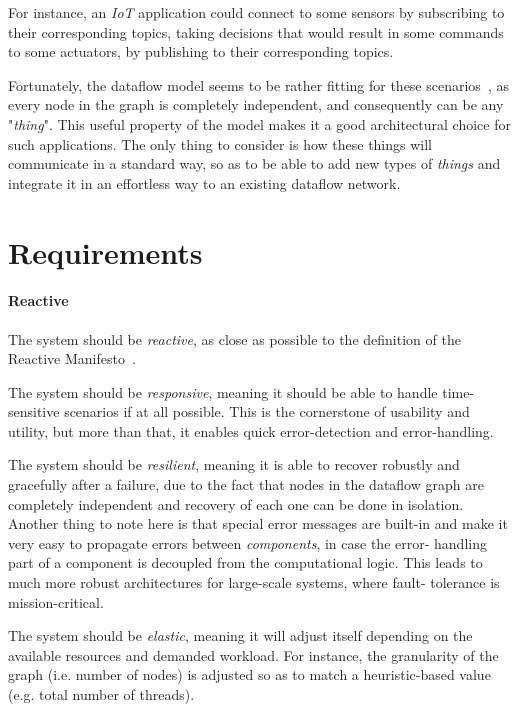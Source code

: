 \documentclass[sigplan,review,anonymous,screen]{acmart}
\begin{document}
For instance, an \textit{IoT} application could connect to some sensors by
subscribing to their corresponding topics, taking decisions that would result in
some commands to some actuators, by publishing to their corresponding topics.

Fortunately, the dataflow model seems to be rather fitting for these
scenarios~\cite{iot_dataflow}, as every node in the graph is completely
independent, and consequently can be any "\textit{thing}". This useful property
of the model makes it a good architectural choice for such applications. The
only thing to consider is how these things will communicate in a standard way,
so as to be able to add new types of \textit{things} and integrate it in an
effortless way to an existing dataflow network.

\section{Requirements} \label{sec:requirements}

\paragraph{Reactive}
The system should be \textit{reactive}, as close as possible to the definition
of the Reactive Manifesto~\cite{manifesto}.

The system should be \textit{responsive}, meaning it should be able to handle
time-sensitive scenarios if at all possible. This is the cornerstone of
usability and utility, but more than that, it enables quick error-detection and
error-handling.

The system should be \textit{resilient}, meaning it is able to recover robustly
and gracefully after a failure, due to the fact that nodes in the dataflow graph
are completely independent and recovery of each one can be done in isolation.
Another thing to note here is that special error messages are built-in and make
it very easy to propagate errors between \textit{components}, in case the error-
handling part of a component is decoupled from the computational logic. This
leads to much more robust architectures for large-scale systems, where fault-
tolerance is mission-critical.

The system should be \textit{elastic}, meaning it will adjust itself depending
on the available resources and demanded workload. For instance, the granularity
of the graph (i.e. number of nodes) is adjusted so as to match a heuristic-based
value (e.g. total number of threads).
\end{document}

